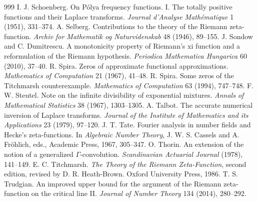 \begin{thebibliography}{999}
 I. J. Schoenberg. On P\'olya frequency functions. I. The totally positive functions and their Laplace transforms. \emph{Journal d'Analyse Math\'ematique} 1 (1951), 331--374.
 A. Selberg. Contributions to the theory of the Riemann zeta-function. \emph{Archiv for Mathematik og Naturvidenskab} 48 (1946), 89--155.
 J. Sondow and C. Dumitrescu. A monotonicity property of Riemann's xi function and a reformulation of the Riemann hypothesis. \emph{Periodica Mathematica Hungarica} 60 (2010), 37--40.
 R. Spira. Zeros of approximate functional approximations. \emph{Mathematics of Computation} 21 (1967), 41--48.
 R. Spira. Some zeros of the Titchmarsh counterexample. \emph{Mathematics of Computation} 63 (1994), 747--748.
 F. W. Steutel. Note on the infinite divisibility of exponential mixtures. \emph{Annals of Mathematical Statistics} 38 (1967), 1303--1305.
 A. Talbot. The accurate numerical inversion of Laplace transforms. \emph{Journal of the Institute of Mathematics and its Applications} 23 (1979), 97--120.
 J. T. Tate. Fourier analysis in number fields and Hecke's zeta-functions. In \emph{Algebraic Number Theory}, J. W. S. Cassels and A. Fr\"ohlich, eds., Academic Press, 1967, 305--347.
 O. Thorin. An extension of the notion of a generalized $\Gamma$-convolution. \emph{Scandinavian Actuarial Journal} (1978), 141--149.
 E. C. Titchmarsh. \emph{The Theory of the Riemann Zeta-Function}, second edition, revised by D. R. Heath-Brown. Oxford University Press, 1986.
 T. S. Trudgian. An improved upper bound for the argument of the Riemann zeta-function on the critical line II. \emph{Journal of Number Theory} 134 (2014), 280--292.

\end{thebibliography}
